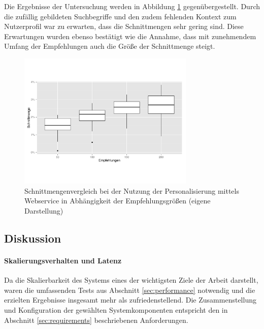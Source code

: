Die Ergebnisse der Untersuchung werden in Abbildung \ref{fig:chart_disjunction} gegenübergestellt. Durch die zufällig gebildeten Suchbegriffe und den zudem fehlenden Kontext zum Nutzerprofil war zu erwarten, dass die Schnittmengen sehr gering sind. Diese Erwartungen wurden ebenso bestätigt wie die Annahme, dass mit zunehmendem Umfang der Empfehlungen auch die Größe der Schnittmenge steigt.

\begin{figure}[htb]
  \centering
    \includegraphics[width=0.75\textwidth]{Abbildungen/disjunction.pdf}
    \caption{Schnittmengenvergleich bei der Nutzung der Personalisierung mittels Webservice in Abhängigkeit der Empfehlungsgrößen {\scriptsize (eigene Darstellung)}}
    \label{fig:chart_disjunction}
\end{figure}

\subsection{Diskussion} \label{sec:discuss}

\paragraph{Skalierungsverhalten und Latenz} Da die Skalierbarkeit des Systems eines der wichtigsten Ziele der Arbeit darstellt, waren die umfassenden Tests aus Abschnitt \ref{sec:performance} notwendig und die erzielten Ergebnisse insgesamt mehr als zufriedenstellend. Die Zusammenstellung und Konfiguration der gewählten Systemkomponenten entspricht den in Abschnitt \ref{sec:requirements} beschriebenen Anforderungen. %

